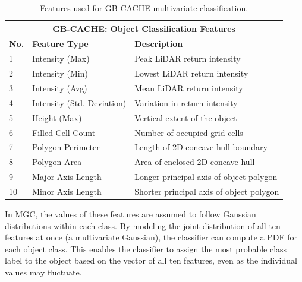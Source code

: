 \documentclass{erauthesis}
\begin{document}
\begin{table}[htbp]
\centering
\begin{tabular}{lll}
\hline
\multicolumn{3}{c}{GB-CACHE: Object Classification Features}\\
\hline
\hline
\textbf{No.} & \textbf{Feature Type} & \textbf{Description} \\ 
\hline
1 & Intensity (Max) & Peak LiDAR return intensity \\
2 & Intensity (Min) & Lowest LiDAR return intensity \\
3 & Intensity (Avg) & Mean LiDAR return intensity \\
4 & Intensity (Std. Deviation) & Variation in return intensity \\
5 & Height (Max) & Vertical extent of the object \\
6 & Filled Cell Count & Number of occupied grid cells \\
7 & Polygon Perimeter & Length of 2D concave hull boundary \\
8 & Polygon Area & Area of enclosed 2D concave hull \\
9 & Major Axis Length & Longer principal axis of object polygon \\
10 & Minor Axis Length & Shorter principal axis of object polygon \\
\hline
\end{tabular}
\caption{Features used for GB-CACHE multivariate classification.}
\label{tab:gbcache_features}
\end{table}

In \ac{MGC}, the values of these features are assumed to follow Gaussian distributions within each class.
By modeling the joint distribution of all ten features at once (a multivariate Gaussian), the classifier can compute a \acl{PDF} for each object class.
This enables the classifier to assign the most probable class label to the object based on the vector of all ten features, even as the individual values may fluctuate.



\end{document}
